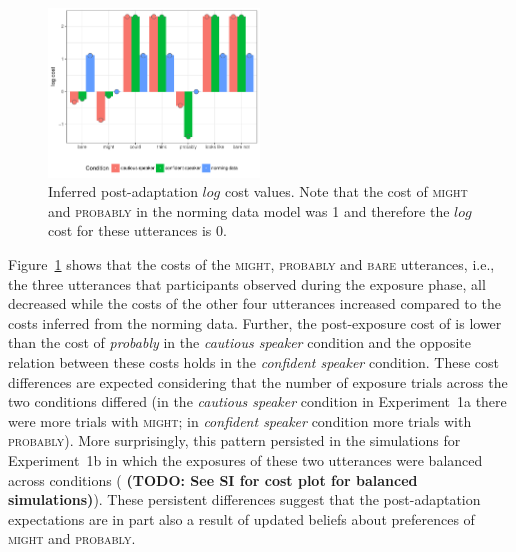 \documentclass[lucida,biblatex]{sp} %
\newcommand{\todo}[1]{}
\renewcommand{\todo}[1]{{\bf \color{red} (TODO: {#1})}}
\begin{document}
\begin{figure}
\center
  \includegraphics[width=0.5\textwidth]{plots/adaptation-posterior-costs.pdf}
  \caption{Inferred post-adaptation $log$ cost values. Note that the cost of \textsc{might} and \textsc{probably} 
  in the norming data model was 1 and therefore the $log$ cost for these utterances is 0.  \label{fig:post-exposure-costs}}
\end{figure}

Figure~\ref{fig:post-exposure-costs} shows that the costs of the \textsc{might}, \textsc{probably} and
\textsc{bare} utterances, i.e., the three utterances that participants observed during the exposure phase,
all decreased while the costs of the other four utterances increased compared to the costs inferred from the norming
data. Further, the post-exposure cost of  is lower than the cost of \textit{probably} in the \textit{cautious speaker} condition
and the opposite relation between these costs holds in the \textit{confident speaker} condition. These cost differences
are expected considering that the number of exposure trials across the two conditions differed (in the \textit{cautious speaker} condition in Experiment~1a there were more trials
with \textsc{might}; in \textit{confident speaker} condition more trials with \textsc{probably}). More surprisingly, this pattern
persisted in the simulations for Experiment~1b in which the exposures of these two utterances were balanced across conditions 
(\todo{See SI for cost plot for balanced simulations}).
These persistent differences suggest that the post-adaptation expectations 
are in part also a result of updated beliefs about preferences of \textsc{might} and \textsc{probably}. 

%
\end{document}
